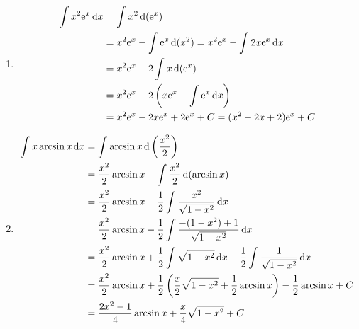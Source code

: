 \begin{solution}
\begin{enumerate}
        \item %
              \begin{align*}
                  \int x^2 \mathrm{e}^x \operatorname{d\!} x & = \int x^2 \operatorname{d}(\mathrm{e}^x)                                                                     \\
                                               & = x^2 \mathrm{e}^x - \int \mathrm{e}^x \operatorname{d}(x^2) = x^2 \mathrm{e}^x - \int 2x \mathrm{e}^x \operatorname{d\!} x \\
                                               & = x^2 \mathrm{e}^x - 2 \int x \operatorname{d}(\mathrm{e}^x)                                                  \\
                                               & = x^2 \mathrm{e}^x - 2 \left( x \mathrm{e}^x - \int \mathrm{e}^x \operatorname{d\!} x \right)                    \\
                                               & = x^2 \mathrm{e}^x - 2x \mathrm{e}^x + 2\mathrm{e}^x + C = (x^2 - 2x + 2)\mathrm{e}^x + C
              \end{align*}

        \item %
              \begin{align*}
                  \int x \arcsin x \operatorname{d\!} x & = \int \arcsin x \operatorname{d}\left(\frac{x^2}{2}\right)                                                                                    \\
                                          & = \frac{x^2}{2} \arcsin x - \int \frac{x^2}{2} \operatorname{d}(\arcsin x)                                                                     \\
                                          & = \frac{x^2}{2} \arcsin x - \frac{1}{2} \int \frac{x^2}{\sqrt{1 - x^2}} \operatorname{d\!} x                                                      \\
                                          & = \frac{x^2}{2} \arcsin x - \frac{1}{2} \int \frac{-(1 - x^2) + 1}{\sqrt{1 - x^2}} \operatorname{d\!} x                                           \\
                                          & = \frac{x^2}{2} \arcsin x + \frac{1}{2} \int \sqrt{1 - x^2} \operatorname{d\!} x - \frac{1}{2} \int \frac{1}{\sqrt{1 - x^2}} \operatorname{d\!} x               \\
                                          & = \frac{x^2}{2} \arcsin x + \frac{1}{2} \left( \frac{x}{2}\sqrt{1 - x^2} + \frac{1}{2}\arcsin x \right) - \frac{1}{2} \arcsin x + C \\
                                          & = \frac{2x^2 - 1}{4} \arcsin x + \frac{x}{4}\sqrt{1 - x^2} + C
              \end{align*}


\end{enumerate}
\end{solution}
